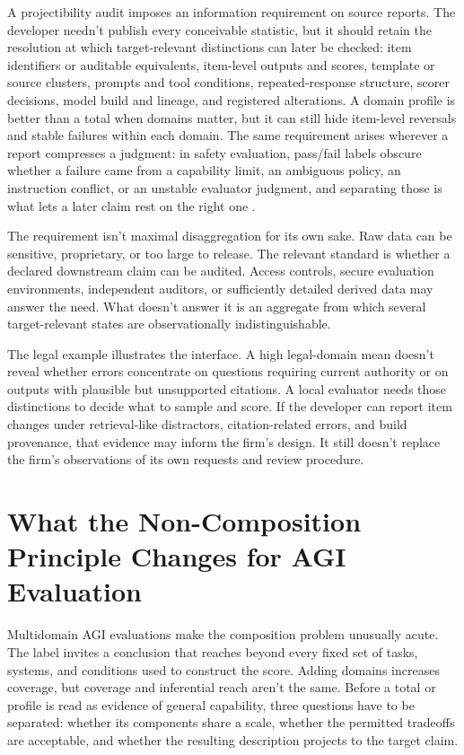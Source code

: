 \documentclass[12pt]{article}
\begin{document}
A projectibility audit imposes an information requirement on source reports. The developer needn't publish every conceivable statistic, but it should retain the resolution at which target-relevant distinctions can later be checked: item identifiers or auditable equivalents, item-level outputs and scores, template or source clusters, prompts and tool conditions, repeated-response structure, scorer decisions, model build and lineage, and registered alterations. A domain profile is better than a total when domains matter, but it can still hide item-level reversals and stable failures within each domain. The same requirement arises wherever a report compresses a judgment: in safety evaluation, pass/fail labels obscure whether a failure came from a capability limit, an ambiguous policy, an instruction conflict, or an unstable evaluator judgment, and separating those is what lets a later claim rest on the right one \citep{anonSelfAdversarialPragmatics}.

The requirement isn't maximal disaggregation for its own sake. Raw data can be sensitive, proprietary, or too large to release. The relevant standard is whether a declared downstream claim can be audited. Access controls, secure evaluation environments, independent auditors, or sufficiently detailed derived data may answer the need. What doesn't answer it is an aggregate from which several target-relevant states are observationally indistinguishable.

The legal example illustrates the interface. A high legal-domain mean doesn't reveal whether errors concentrate on questions requiring current authority or on outputs with plausible but unsupported citations. A local evaluator needs those distinctions to decide what to sample and score. If the developer can report item changes under retrieval-like distractors, citation-related errors, and build provenance, that evidence may inform the firm's design. It still doesn't replace the firm's observations of its own requests and review procedure.

\section{What the Non-Composition Principle Changes for AGI Evaluation}\label{sec:agi}

Multidomain AGI evaluations make the composition problem unusually acute. The label  invites a conclusion that reaches beyond every fixed set of tasks, systems, and conditions used to construct the score. Adding domains increases coverage, but coverage and inferential reach aren't the same. Before a total or profile is read as evidence of general capability, three questions have to be separated: whether its components share a scale, whether the permitted tradeoffs are acceptable, and whether the resulting description projects to the target claim.
\end{document}
